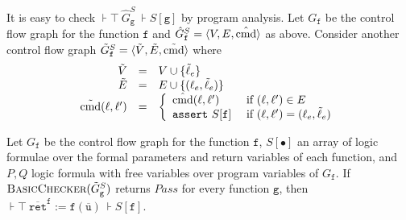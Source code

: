 It is easy to check $\assert{\top}\ \hat{G}^S_{\mathtt{g}}\
\assert{S[\mathtt{g}]}$ by program analysis. Let $G_{\mathtt{f}}$ be
the control flow graph for the function $\mathtt{f}$ and
$\hat{G}^S_{\mathtt{f}} = \langle V, E, \hat{\textmd{cmd}} \rangle$ as
above. Consider another control flow graph $\tilde{G}^S_{\mathtt{f}} =
\langle \tilde{V}, \tilde{E}, \tilde{\textmd{cmd}} \rangle$ where
\begin{equation*}
  \begin{array}{rcl}
    \tilde{V} & = & V \cup \{ \tilde{\ell}_e \}\\
    \tilde{E} & = & E \cup \{ (\ell_e, \tilde{\ell}_e) \}\\
    \tilde{\textmd{cmd}} (\ell, \ell') & = &
    \left\{
      \begin{array}{ll}
        \hat{\textmd{cmd}} (\ell, \ell') & 
        \textmd{ if } (\ell, \ell') \in E\\
        \mathtt{assert\ } S[\mathtt{f}] &
        \textmd{ if } (\ell, \ell') = (\ell_e, \tilde{\ell}_e)
      \end{array}
    \right.
  \end{array}
\end{equation*}

\begin{corollary}
  Let $G_{\mathtt{f}}$ be the control flow graph for the function
  $\mathtt{f}$, $S[\bullet]$ an array of logic formulae over the formal
  parameters and return variables of each function, and 
  $P, Q$ logic formula with free variables over program variables of
  $G_{\mathtt{f}}$. If $\textsc{BasicChecker}
  (\tilde{G}^S_{\mathtt{g}})$ returns $\mathit{Pass}$ for every function
  $\mathtt{g}$, then $\assert{\top}\ \mathtt{\overline{ret}^f} :=
  \mathtt{f} (\overline{\mathtt{u}})\ \assert{S[\mathtt{f}]}$.
\end{corollary}